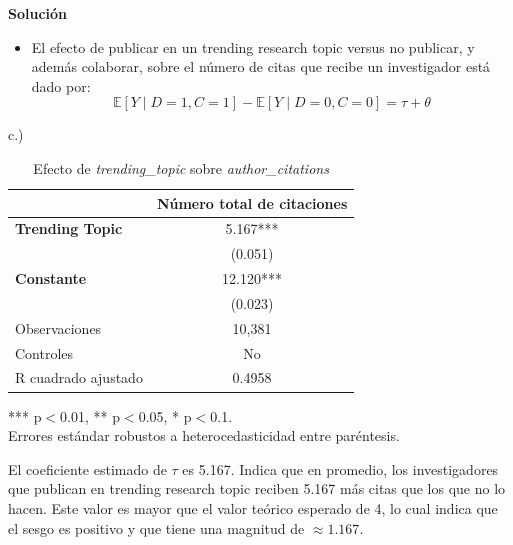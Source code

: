 \documentclass[a4paper, answers, addpoints, 11pt]{exam}
\newenvironment{solucion}{%
  \begin{mdframed}[
    backgroundcolor=blue!5,    %
    linecolor=blue!50,          %
    linewidth=2pt,              %
    leftmargin=10pt,            %
    rightmargin=10pt,           %
    topline=true,              %
    bottomline=true,            %
    roundcorner=10pt,           %
    innerleftmargin=10pt,       %
    innerrightmargin=10pt,      %
    innerbottommargin=10pt,     %
    innertopmargin=10pt         %
  ]%
  \begin{tcolorbox}[colframe=blue!50!black, colback=blue!50, coltitle=white, sharp corners=all, boxrule=1mm, width=\textwidth, halign=left, valign=center, top=0mm, bottom=0mm, left=0mm, right=0mm] \textbf{Solución} \end{tcolorbox} }{\end{mdframed}}
\begin{document}
\begin{itemize}
\begin{solucion}
\begin{itemize}
    \item El efecto de publicar en un trending research topic versus no publicar, y además colaborar, sobre el número de citas que recibe un investigador está dado por:
    \[
\mathbb{E}[Y \mid D=1, C=1]- \mathbb{E}[Y \mid D=0, C=0] = \tau +\theta
\]


\end{itemize}

c.)\begin{table}[H]
    \centering
    \caption{Efecto de \textit{trending\_topic} sobre \textit{author\_citations}}
    \label{tab:resultados}
    \begin{tabular}{l c}
        \toprule
        & Número total de citaciones\\
        \midrule
        \textbf{Trending Topic} & 5.167*** \\
        & (0.051) \\
        \textbf{Constante} & 12.120*** \\
        & (0.023) \\
        \midrule
        Observaciones & 10,381 \\
        Controles & No \\
        R cuadrado ajustado & 0.4958 \\
        \bottomrule
    \end{tabular}
    
    \vspace{0.3cm}
    \footnotesize{*** p$<$0.01, ** p$<$0.05, * p$<$0.1. \\
    Errores estándar robustos a heterocedasticidad entre paréntesis.}
\end{table}

El coeficiente estimado de $\tau$ es 5.167. Indica que en promedio, los investigadores que publican en trending research topic reciben 5.167 más citas que los que no lo hacen. Este valor es  mayor que el valor teórico esperado de 4, lo cual indica que el sesgo es positivo y que tiene una magnitud de $\approx 1.167$.


\end{solucion}
\end{itemize}
\end{document}
